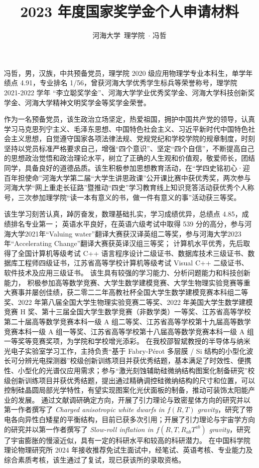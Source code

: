 \documentclass[12pt]{ctexart}
\title{2023 年度国家奖学金个人申请材料}
\author{河海大学\ 理学院\ $\cdot$ 冯哲}
\begin{document}
\maketitle

冯哲，男，汉族，中共预备党员，理学院 2020 级应用物理学专业本科生，单学年绩点 4.91，专业排名 1/56，曾获河海大学优秀学生标兵等荣誉称号，理学院 2021-2022 学年 “李立聪奖学金”、河海大学学业优秀奖学金、河海大学科技创新奖学金、河海大学精神文明奖学金等奖学金荣誉。

作为一名预备党员，该生政治立场坚定，热爱祖国，拥护中国共产党的领导，认真学习马克思列宁主义、毛泽东思想、中国特色社会主义、习近平新时代中国特色社会主义思想，自觉遵守国家各项法律法规、党规党纪和学校学院的规章制度，时刻坚持以党员标准严格要求自己，增强“四个意识”、坚定“四个自信”，不断提高自己的思想政治觉悟和政治理论水平，树立了正确的人生观和价值观，敬爱师长，团结同学，具备良好的道德品质。该生积极参加思想教育活动，在“学四史铭初心·迎百年担使命”河海大学第二届“大学生讲思政课”公开课比赛中获优秀奖，两次参与河海大学“网上重走长征路”暨推动“四史”学习教育线上知识竞答活动获优秀个人称号，三次参加理学院“读一本有意义的书，做一件有意义的事”活动获三等奖。

该生学习刻苦认真，踔厉奋发，数理基础扎实，学习成绩优异，总绩点 4.85，成绩排名专业第一；
英语水平良好，在英语六级考试中取得 539 分的高分，参与河海大学2021年“Valuing water”翻译大赛获汉译英组二等奖，参与河海大学2023年“Accelerating Change”翻译大赛获英译汉组三等奖；
计算机水平优秀，先后取得了全国计算机等级考试 C++ 语言程序设计二级证书、数据库技术三级证书、数据库工程师四级证书，江苏省高等学校计算机等级考试 Visual C++ 二级证书、软件技术及应用三级证书。
该生具有较强的学习能力、分析问题能力和科技创新能力，
积极参加高等数学竞赛、大学生数学建模竞赛、大学生物理实验竞赛等重大赛事并屡创佳绩，获二零二二年高教社杯全国大学生数学建模竞赛本科组二等奖、2022 年第八届全国大学生物理实验竞赛二等奖、2022 年美国大学生数学建模竞赛 H 奖、第十三届全国大学生数学竞赛（非数学类）一等奖、江苏省高等学校第二十届高等数学竞赛本科一级 A 组二等奖、江苏省高等学校第十九届高等数学竞赛本科一级 A 组一等奖、江苏省高等学校第十八届高等数学竞赛本科一级 A 组一等奖等竞赛奖项，为学院和学校增光添彩。
在我校邵智斌教授的半导体与纳米光电子实验室学习工作，主持负责“基于 Fabry-P{\'e}rot 多层膜 / Si 结构的小型化波长可分辨光电探测器”校级创新训练项目并获优秀结题，基本满足了时效性、便携性、小型化的光谱仪应用需求；参与“激光刻蚀辅助硅微纳结构图案化制备研究”校级创新训练项目并获优秀结题，提出通过精确调控硅微纳结构的尺寸和位置，可以控制硅晶圆局部光学特性，有望实现图案化光伏面板的制备，推动可装饰太阳能产业的发展。
通过文献调研确定方向，开展了引力理论与致密星体方向的研究并以第一作者撰写了 \textit{Charged anisotropic white dwarfs in $f\left(R, T\right)$ gravity}，研究了带电各向异性白矮星的平衡结构，目前已获多次引用；开展了引力理论与宇宙学方向的研究并以第一作者撰写了 \textit{Slow-roll inflation in $f\left(R, T, R_{ab}T^{ab}\right)$ gravity}，研究了宇宙膨胀的慢滚近似，具有一定的科研水平和较高的科研潜力。
在中国科学院理论物理研究所 2024 年接收推荐免试生面试中，经笔试、英语考核、专业能力及综合素质考核，该生通过了复试，现已获该所的录取资格。
\end{document}
